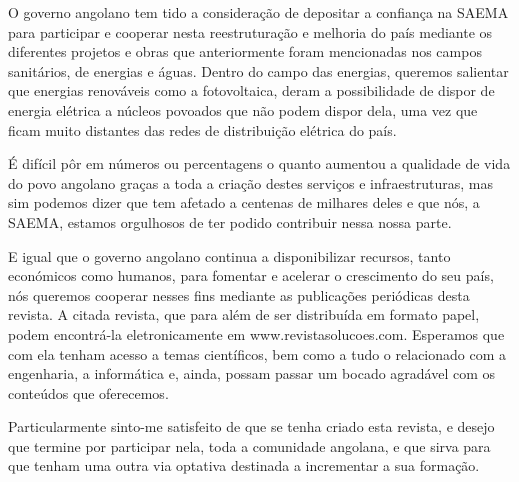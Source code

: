 O governo angolano tem tido a consideração de depositar a confiança na SAEMA para participar e cooperar nesta reestruturação e melhoria do país mediante os diferentes projetos e obras que anteriormente foram mencionadas nos campos sanitários, de energias e águas. Dentro do campo das energias, queremos salientar que energias renováveis como a fotovoltaica, deram a possibilidade de dispor de energia elétrica a núcleos povoados que não podem dispor dela, uma vez que ficam muito distantes das redes de distribuição elétrica do país.

É difícil pôr em números ou percentagens o quanto aumentou a qualidade de vida do povo angolano graças a toda a criação destes serviços e infraestruturas, mas sim podemos dizer que tem afetado a centenas de milhares deles e que nós, a SAEMA, estamos orgulhosos de ter podido contribuir nessa nossa parte.

E igual que o governo angolano continua a disponibilizar recursos, tanto económicos como  humanos, para fomentar e acelerar o crescimento do seu país, nós queremos cooperar nesses fins mediante as publicações periódicas desta revista. A citada revista, que para além de ser distribuída em formato papel, podem encontrá-la eletronicamente em www.revistasolucoes.com. Esperamos que com ela tenham acesso a temas científicos, bem como a tudo o relacionado com a engenharia, a informática e, ainda, possam passar um bocado agradável com os conteúdos que oferecemos.

Particularmente sinto-me satisfeito de que se tenha criado esta revista, e desejo que termine por participar nela, toda a comunidade angolana, e que sirva para que tenham uma outra via optativa destinada a incrementar a sua formação.


%


\newpage


